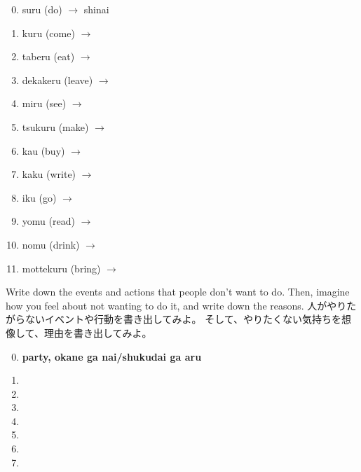 \documentclass[uplatex,dvipdfmx,b5paper,english,10pt]{jsbook}
\begin{document}
\begin{multicols}{2}
 \begin{enumerate}
 \setcounter{enumi}{-1}
 \item suru (do) $\rightarrow$ shinai%
 \item kuru (come)   $\rightarrow$ \hrulefill
 \item taberu (eat)   $\rightarrow$ \hrulefill
 \item dekakeru (leave) $\rightarrow$ \hrulefill
 \item miru (see)  $\rightarrow$ \hrulefill
 \item tsukuru (make) $\rightarrow$ \hrulefill
 \item kau (buy)   $\rightarrow$ \hrulefill
 \item kaku (write)  $\rightarrow$ \hrulefill
 \item iku (go)   $\rightarrow$ \hrulefill
 \item yomu (read)   $\rightarrow$ \hrulefill
 \item nomu (drink)   $\rightarrow$ \hrulefill
 \item mottekuru (bring)   $\rightarrow$ \hrulefill
 \end{enumerate}
\end{multicols}


\begin{toiquestion}
\ifEnglish
Write down the events and actions that people don't want to do.
Then, imagine how you feel about not wanting to do it, and write down the reasons.
\else
人がやりたがらないイベントや行動を書き出してみよ。
そして、やりたくない気持ちを想像して、理由を書き出してみよ。
\fi
\end{toiquestion}

\begin{enumerate}
 \setcounter{enumi}{-1}
 \item {\bfseries party, okane ga nai/shukudai ga aru }\hrulefill
 \item \hrulefill
 \item \hrulefill
 \item \hrulefill
 \item \hrulefill
 \item \hrulefill
 \item \hrulefill
 \item \hrulefill
\end{enumerate}
\end{document}
